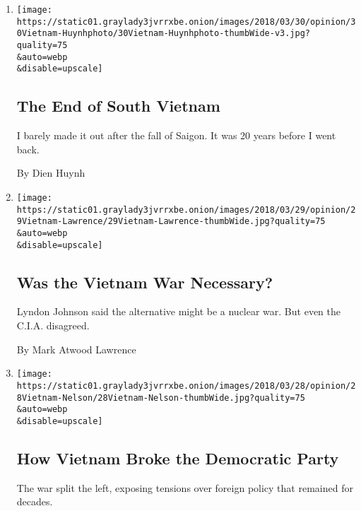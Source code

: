 \begin{enumerate}
\def\labelenumi{\arabic{enumi}.}
\item
  \href{/2018/03/30/opinion/the-end-of-south-vietnam.html}{}

  \texttt{[image: https://static01.graylady3jvrrxbe.onion/images/2018/03/30/opinion/30Vietnam-Huynhphoto/30Vietnam-Huynhphoto-thumbWide-v3.jpg?quality=75\\\&auto=webp\\\&disable=upscale]}

  \hypertarget{the-end-of-south-vietnam}{%
  \subsection{The End of South Vietnam}\label{the-end-of-south-vietnam}}

  I barely made it out after the fall of Saigon. It was 20 years before
  I went back.

  By Dien Huynh
\item
  \href{/2018/03/29/opinion/vietnam-war-necessary.html}{}

  \texttt{[image: https://static01.graylady3jvrrxbe.onion/images/2018/03/29/opinion/29Vietnam-Lawrence/29Vietnam-Lawrence-thumbWide.jpg?quality=75\\\&auto=webp\\\&disable=upscale]}

  \hypertarget{was-the-vietnam-war-necessary}{%
  \subsection{Was the Vietnam War
  Necessary?}\label{was-the-vietnam-war-necessary}}

  Lyndon Johnson said the alternative might be a nuclear war. But even
  the C.I.A. disagreed.

  By Mark Atwood Lawrence
\item
  \href{/2018/03/28/opinion/vietnam-broke-democratic-party.html}{}

  \texttt{[image: https://static01.graylady3jvrrxbe.onion/images/2018/03/28/opinion/28Vietnam-Nelson/28Vietnam-Nelson-thumbWide.jpg?quality=75\\\&auto=webp\\\&disable=upscale]}

  \hypertarget{how-vietnam-broke-the-democratic-party}{%
  \subsection{How Vietnam Broke the Democratic
  Party}\label{how-vietnam-broke-the-democratic-party}}

  The war split the left, exposing tensions over foreign policy that
  remained for decades.


\end{enumerate}
